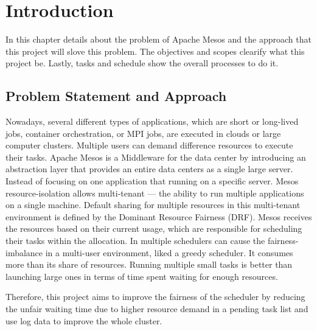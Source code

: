 \documentclass[12pt,oneside,openright,a4paper]{cpe-english-project}
\begin{document}


\chapter{Introduction}

In this chapter details about the problem of Apache Mesos and the approach that this project will slove this problem. The objectives and scopes clearify what this project be. Lastly, tasks and schedule show the overall processes to do it.

\section{Problem Statement and Approach} 

\hspace{10mm}Nowadays, several different types of applications, which are short or long-lived jobs, container orchestration, or MPI jobs, are executed in clouds or large computer clusters. Multiple users can demand difference resources to execute their tasks. Apache Mesos is a Middleware for the data center by introducing an abstraction layer that provides an entire data centers as a single large server. Instead of focusing on one application that running on a specific server. Mesos resource-isolation allows multi-tenant — the ability to run multiple applications on a single machine. Default sharing for multiple resources in this multi-tenant environment is defined by the Dominant Resource Fairness (DRF). Mesos receives the resources based on their current usage, which are responsible for scheduling their tasks within the allocation. In multiple schedulers can cause the fairness-imbalance in a multi-user environment, liked a greedy scheduler. It consumes more than its share of resources. Running multiple small tasks is better than launching large ones in terms of time spent waiting for enough resources. 

\hspace{10mm}Therefore, this project aims to improve the fairness of the scheduler by reducing the unfair waiting time due to higher resource demand in a pending task list and use log data to improve the whole cluster.
\end{document}
